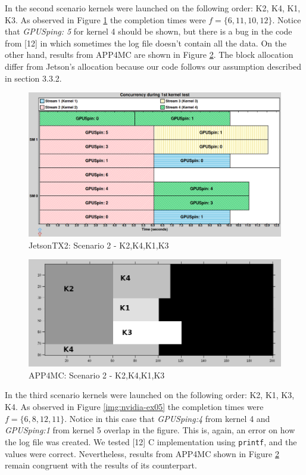 \documentclass[
  12pt,
  a4paperpaper,
]{report}
\begin{document}
In the second scenario kernels were launched on the following order: K2,
K4, K1, K3. As observed in Figure \ref{img:nvidia-ex02} the completion
times were \(f = \{6,11,10,12\}\). Notice that \emph{GPUSping: 5} for
kernel 4 should be shown, but there is a bug in the code from {[}12{]}
in which sometimes the log file doesn't contain all the data. On the
other hand, results from APP4MC are shown in Figure
\ref{img:octave-ex02}. The block allocation differ from Jetson's
allocation because our code follows our assumption described in section
3.3.2.

\begin{figure}
\centering
\includegraphics[width=1\textwidth,height=\textheight]{source/figures/nvidia/ex02.png}
\caption{JetsonTX2: Scenario 2 - K2,K4,K1,K3 \label{img:nvidia-ex02}}
\end{figure}

\begin{figure}
\centering
\includegraphics[width=1\textwidth,height=\textheight]{source/figures/octave/ex02.png}
\caption{APP4MC: Scenario 2 - K2,K4,K1,K3 \label{img:octave-ex02}}
\end{figure}

In the third scenario kernels were launched on the following order: K2,
K1, K3, K4. As observed in Figure \ref{img:nvidia-ex05} the completion
times were \(f = \{6,8,12,11\}\). Notice in this case that
\emph{GPUSping:4} from kernel 4 and \emph{GPUSping:1} from kernel 5
overlap in the figure. This is, again, an error on how the log file was
created. We tested {[}12{]} C implementation using \texttt{printf}, and
the values were correct. Nevertheless, results from APP4MC shown in
Figure \ref{img:octave-ex02} remain congruent with the results of its
counterpart.
\end{document}
